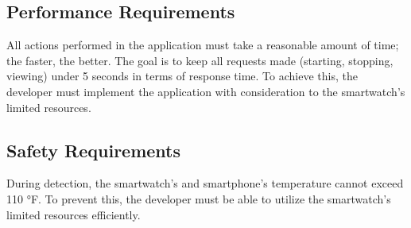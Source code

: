 \documentclass[12pt]{article}
\begin{document}
\subsection{Performance Requirements}
All actions performed in the application must take a reasonable amount of time; the faster, the better. The goal is to keep all requests made (starting, stopping, viewing) under 5 seconds in terms of response time. To achieve this, the developer must implement the application with consideration to the smartwatch's limited resources.

\subsection{Safety Requirements}
During detection, the smartwatch's and smartphone's temperature cannot exceed 110 °F. To prevent this, the developer must be able to utilize the smartwatch's limited resources efficiently.
\end{document}
